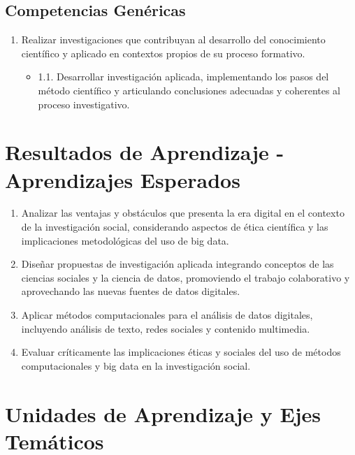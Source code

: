 \documentclass[11pt,letter,]{article}
\providecommand{\tightlist}{%
  \setlength{\itemsep}{0pt}\setlength{\parskip}{0pt}}
\begin{document}
\hypertarget{competencias-genuxe9ricas}{%
\subsection{Competencias Genéricas}\label{competencias-genuxe9ricas}}

\begin{enumerate}
\def\labelenumi{\arabic{enumi}.}
\tightlist
\item
  Realizar investigaciones que contribuyan al desarrollo del
  conocimiento científico y aplicado en contextos propios de su proceso
  formativo.

  \begin{itemize}
  \tightlist
  \item
    1.1. Desarrollar investigación aplicada, implementando los pasos del
    método científico y articulando conclusiones adecuadas y coherentes
    al proceso investigativo.
  \end{itemize}
\end{enumerate}

\hypertarget{resultados-de-aprendizaje---aprendizajes-esperados}{%
\section{Resultados de Aprendizaje - Aprendizajes
Esperados}\label{resultados-de-aprendizaje---aprendizajes-esperados}}

\begin{enumerate}
\def\labelenumi{\arabic{enumi}.}
\tightlist
\item
  Analizar las ventajas y obstáculos que presenta la era digital en el
  contexto de la investigación social, considerando aspectos de ética
  científica y las implicaciones metodológicas del uso de big data.
\item
  Diseñar propuestas de investigación aplicada integrando conceptos de
  las ciencias sociales y la ciencia de datos, promoviendo el trabajo
  colaborativo y aprovechando las nuevas fuentes de datos digitales.
\item
  Aplicar métodos computacionales para el análisis de datos digitales,
  incluyendo análisis de texto, redes sociales y contenido multimedia.
\item
  Evaluar críticamente las implicaciones éticas y sociales del uso de
  métodos computacionales y big data en la investigación social.
\end{enumerate}

\hypertarget{unidades-de-aprendizaje-y-ejes-temuxe1ticos}{%
\section{Unidades de Aprendizaje y Ejes
Temáticos}\label{unidades-de-aprendizaje-y-ejes-temuxe1ticos}}
\end{document}
